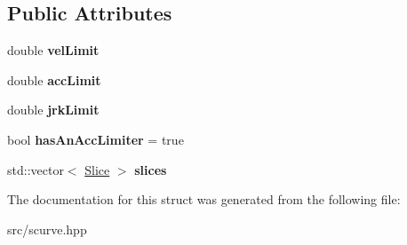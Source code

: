 \subsection*{Public Attributes}
\begin{DoxyCompactItemize}
\item 
\mbox{\label{structInfiniteSCurve_afffeea3c29edeb6f435d56d0890bfc24}} 
double {\bfseries vel\+Limit}
\item 
\mbox{\label{structInfiniteSCurve_a9a88861b36039656051de878c7dd0a49}} 
double {\bfseries acc\+Limit}
\item 
\mbox{\label{structInfiniteSCurve_a003a161d42ef0fa689a6b14dee4893b8}} 
double {\bfseries jrk\+Limit}
\item 
\mbox{\label{structInfiniteSCurve_a853f84ab263de53a283e87c466b55500}} 
bool {\bfseries has\+An\+Acc\+Limiter} = true
\item 
\mbox{\label{structInfiniteSCurve_a5bf95b93d8fc8fd523834d9c4f0dd30b}} 
std\+::vector$<$ \hyperlink{structSlice}{Slice} $>$ {\bfseries slices}
\end{DoxyCompactItemize}


The documentation for this struct was generated from the following file\+:\begin{DoxyCompactItemize}
\item 
src/scurve.\+hpp\end{DoxyCompactItemize}
